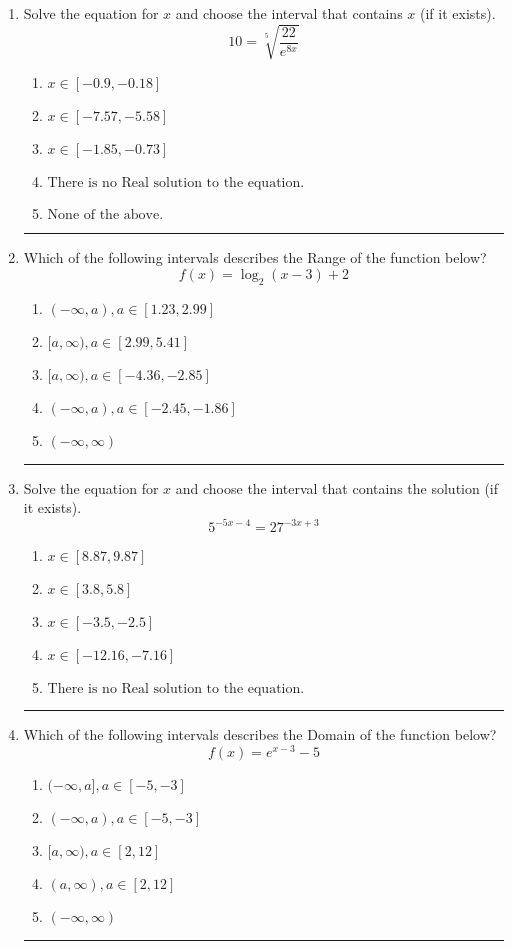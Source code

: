 \documentclass[14pt]{extbook}
\newcommand{\litem}[1]{\item#1\hspace*{-1cm}\rule{\textwidth}{0.4pt}}
\begin{document}
\begin{enumerate}
\litem{
 Solve the equation for $x$ and choose the interval that contains $x$ (if it exists).\[  10 = \sqrt[5]{\frac{22}{e^{8x}}} \]\begin{enumerate}[label=\Alph*.]
\item \( x \in [-0.9, -0.18] \)
\item \( x \in [-7.57, -5.58] \)
\item \( x \in [-1.85, -0.73] \)
\item \( \text{There is no Real solution to the equation.} \)
\item \( \text{None of the above.} \)

\end{enumerate} }
\litem{
Which of the following intervals describes the Range of the function below?\[ f(x) = \log_2{(x-3)}+2 \]\begin{enumerate}[label=\Alph*.]
\item \( (-\infty, a), a \in [1.23, 2.99] \)
\item \( [a, \infty), a \in [2.99, 5.41] \)
\item \( [a, \infty), a \in [-4.36, -2.85] \)
\item \( (-\infty, a), a \in [-2.45, -1.86] \)
\item \( (-\infty, \infty) \)

\end{enumerate} }
\litem{
Solve the equation for $x$ and choose the interval that contains the solution (if it exists).\[ 5^{-5x-4} = 27^{-3x+3} \]\begin{enumerate}[label=\Alph*.]
\item \( x \in [8.87, 9.87] \)
\item \( x \in [3.8, 5.8] \)
\item \( x \in [-3.5, -2.5] \)
\item \( x \in [-12.16, -7.16] \)
\item \( \text{There is no Real solution to the equation.} \)

\end{enumerate} }
\litem{
Which of the following intervals describes the Domain of the function below?\[ f(x) = e^{x-3}-5 \]\begin{enumerate}[label=\Alph*.]
\item \( (-\infty, a], a \in [-5, -3] \)
\item \( (-\infty, a), a \in [-5, -3] \)
\item \( [a, \infty), a \in [2, 12] \)
\item \( (a, \infty), a \in [2, 12] \)
\item \( (-\infty, \infty) \)


\end{enumerate}}
\end{enumerate}
\end{document}
